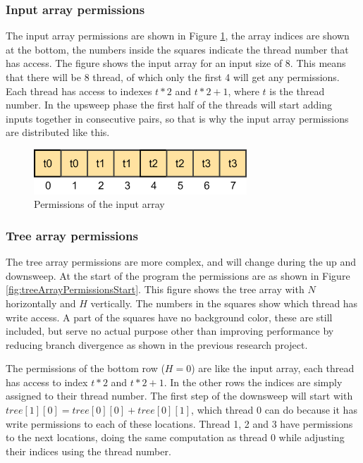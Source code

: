 \documentclass[a4paper]{article}
\begin{document}
\subsubsection{Input array permissions}
The input array permissions are shown in Figure \ref{fig:inputArrayPermissions}, the array indices are shown at the bottom, the numbers inside the squares indicate the thread number that has access. The figure shows the input array for an input size of 8. This means that there will be 8 thread, of which only the first 4 will get any permissions. Each thread has access to indexes $t*2$ and $t*2+1$, where $t$ is the thread number. In the upsweep phase the first half of the threads will start adding inputs together in consecutive pairs, so that is why the input array permissions are distributed like this.

\begin{figure}[htb!]
	\centering
	\includegraphics[width=80mm]{../images/input-permissions-v1.png}
	\caption{Permissions of the input array}
	\label{fig:inputArrayPermissions}
\end{figure}
\FloatBarrier

\subsubsection{Tree array permissions}
The tree array permissions are more complex, and will change during the up and downsweep. At the start of the program the permissions are as shown in Figure \ref{fig:treeArrayPermissionsStart}. This figure shows the tree array with $N$ horizontally and $H$ vertically. The numbers in the squares show which thread has write access. A part of the squares have no background color, these are still included, but serve no actual purpose other than improving performance by reducing branch divergence as shown in the previous research project.

The permissions of the bottom row ($H=0$) are like the input array, each thread has access to index $t*2$ and $t*2+1$. In the other rows the indices are simply assigned to their thread number. The first step of the downsweep will start with $tree[1][0] = tree[0][0] + tree[0][1]$, which thread 0 can do because it has write permissions to each of these locations. Thread 1, 2 and 3 have permissions to the next locations, doing the same computation as thread 0 while adjusting their indices using the thread number.
\end{document}
